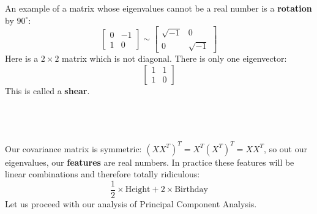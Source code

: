 \documentclass[12pt]{article}
\begin{document}
\noindent An example of a matrix whose eigenvalues cannot be a real number is a \textbf{rotation} by $90^\circ$: 
$$ \left[ \begin{array}{cr} 0 & -1 \\ 1 & 0 \end{array}\right] 
\sim \left[ \begin{array}{cr} \sqrt{-1} & 0 \\ 0 & \sqrt{-1} \end{array}\right] $$
Here is a $2 \times 2$ matrix which is not diagonal.  There is only one eigenvector:
$$ \left[ \begin{array}{cr} 1 & 1 \\ 1 & 0 \end{array}\right] $$
This is called a \textbf{shear}.  \\ \\
\\ \\
Our covariance matrix is symmetric: $(X X^T)^T = X^T (X^T)^T = X X^T$, so out our eigenvalues, our {\color{green!20!blue} \textbf{features}} are real numbers.  In practice these features will be linear combinations and therefore totally ridiculous:
$$ \frac{1}{2} \times \text{Height} + 2 \times \text{Birthday} $$
Let us proceed with our analysis of Principal Component Analysis.\\
\end{document}
